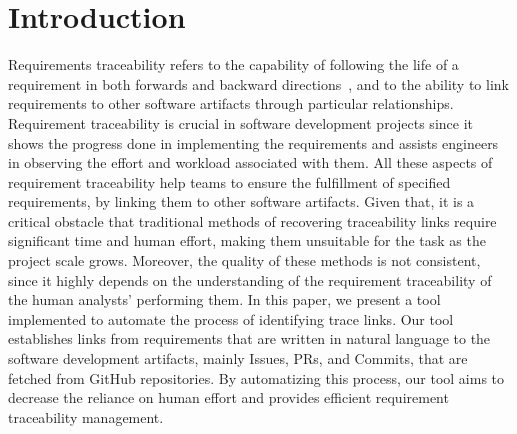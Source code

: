 \section{Introduction}
\label{sec:intro}


Requirements traceability refers to the capability of following the life of a requirement in both forwards and backward directions~\cite{gotel-1994}, and to the ability to link requirements to other software artifacts through particular relationships. Requirement traceability is crucial in software development projects since it shows the progress done in implementing the requirements and assists engineers in observing the effort and workload associated with them. All these aspects of requirement traceability help teams to ensure the fulfillment of specified requirements, by linking them to other software artifacts. Given that, it is a critical obstacle that traditional methods of recovering traceability links require significant time and human effort, making them unsuitable for the task as the project scale grows. Moreover, the quality of these methods is not consistent, since it highly depends on the understanding of the requirement traceability of the human analysts' performing them.
In this paper, we present a tool implemented to automate the process of identifying trace links. Our tool establishes links from requirements that are written in natural language to the software development artifacts, mainly Issues, PRs, and Commits, that are fetched from GitHub repositories. By automatizing this process, our tool aims to decrease the reliance on human effort and provides efficient requirement traceability management.


